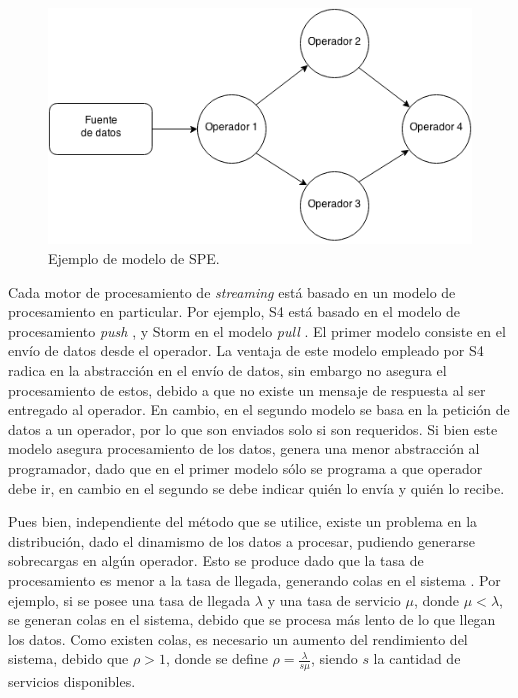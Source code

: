 \begin{figure}[ht!]
  \centering
    \includegraphics[scale=0.5]{images/Grafo.png}
  \caption{Ejemplo de modelo de SPE.}
  \label{fig:grafo}
\end{figure}

Cada motor de procesamiento de \textsl{streaming} está basado en un modelo de procesamiento en particular. Por ejemplo, S4 está basado en el modelo de procesamiento \textsl{push} \citep{s4yahoo}, y Storm en el modelo \textsl{pull} \citep{stormtwitter}. El primer modelo consiste en el envío de datos desde el operador. La ventaja de este modelo empleado por S4 radica en la abstracción en el envío de datos, sin embargo no asegura el procesamiento de estos, debido a que no existe un mensaje de respuesta al ser entregado al operador. En cambio, en el segundo modelo se basa en la petición de datos a un operador, por lo que son enviados solo si son requeridos. Si bien este modelo asegura procesamiento de los datos, genera una menor abstracción al programador, dado que en el primer modelo sólo se programa a que operador debe ir, en cambio en el segundo se debe indicar quién lo envía y quién lo recibe.

Pues bien, independiente del método que se utilice, existe un problema en la distribución, dado el dinamismo de los datos a procesar, pudiendo generarse sobrecargas en algún operador. Esto se produce dado que la tasa de procesamiento es menor a la tasa de llegada, generando colas en el sistema \citep{queueingtheory}. Por ejemplo, si se posee una tasa de llegada $\lambda$ y una tasa de servicio $\mu$, donde $\mu < \lambda$, se generan colas en el sistema, debido que se procesa más lento de lo que llegan los datos. Como existen colas, es necesario un aumento del rendimiento del sistema, debido que $\rho > 1 $, donde se define $\rho = \frac{\lambda}{s\mu}$, siendo $s$ la cantidad de servicios disponibles.

